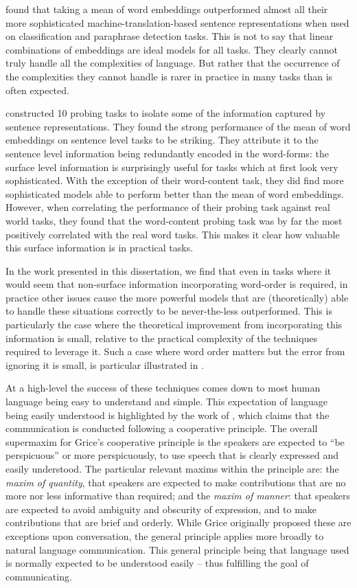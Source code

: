 \documentclass{book}
\begin{document}
\citet{acl2018bleuopposedmeaning} found that taking a mean of word embeddings outperformed almost all their more sophisticated machine-translation-based sentence representations when used on classification and paraphrase detection tasks.
This is not to say that linear combinations of embeddings are ideal models for all tasks.
They clearly cannot truly handle all the complexities of language.
But rather that the occurrence of the complexities they cannot handle is rarer in practice in many tasks than is often expected.

\citet{ac2018probingsentencevectors} constructed 10 probing tasks to isolate some of the information captured by sentence representations.
They found the strong performance of the mean of word embeddings on sentence level tasks to be striking.
They attribute it to the sentence level information being redundantly encoded in the word-forms: the surface level information is surprisingly useful for tasks which at first look very sophisticated.
With the exception of their word-content task, they did find more sophisticated models able to perform better than the mean of word embeddings.
However, when correlating the performance of their probing task against real world tasks,
they found that the word-content probing task was by far the most positively correlated with the real word tasks.
This makes it clear how valuable this surface information is in practical tasks.



In the work presented in this dissertation, 
we find that even in tasks where it would seem that non-surface information incorporating word-order is required,
in practice other issues cause the more powerful models that are (theoretically) able to handle these situations correctly to be never-the-less outperformed.
This is particularly the case where the theoretical improvement from incorporating this information is small, relative to the practical complexity of the techniques required to leverage it.
Such a case where word order matters but the error from ignoring it is small, is particular illustrated in .

At a high-level the success of these techniques comes down to most human language being easy to understand and simple.
This expectation of language being easily understood is highlighted by the work of \citet{grice1975logic}, which claims that the communication is conducted following a cooperative principle.
The overall supermaxim for Grice's cooperative principle is the speakers are expected to ``be perspicuous'' or more perspicuously, to use speech that is clearly expressed and easily understood.
The particular relevant maxims within the principle are:
the \emph{maxim of quantity}, that speakers are expected to make contributions that are no more nor less informative than required;
and the \emph{maxim of manner}: that speakers are expected to avoid ambiguity and obscurity of expression, and to make contributions that are brief and orderly.
While Grice originally proposed these are exceptions upon conversation, the general principle applies more broadly to natural language communication.
This general principle being that language used is normally expected to be understood easily -- thus fulfilling the goal of communicating.
\end{document}
